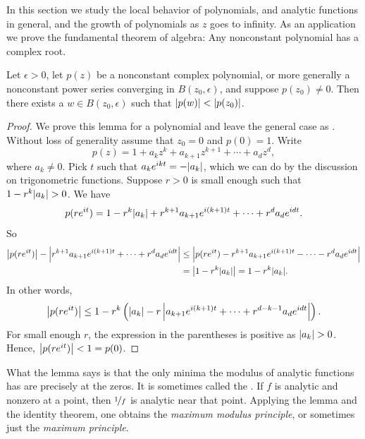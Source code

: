 
In this section we study the local behavior of polynomials,
and analytic functions in general, and the growth of polynomials as $z$ goes to infinity.
As an application we prove the fundamental theorem of algebra: Any nonconstant polynomial
has a complex root.

\begin{lemma} \label{lemma:polyalwaysgetssmaller}
Let $\epsilon > 0$,
let $p(z)$ be a nonconstant complex polynomial, or more generally
a nonconstant power series converging in $B(z_0,\epsilon)$,
and suppose $p(z_0) \not= 0$.
Then there exists a $w \in B(z_0,\epsilon)$ such that $\lvert {p(w)} \rvert < \lvert {p(z_0)} \rvert$.
\end{lemma}

\begin{proof}
We prove this lemma for a polynomial and leave the general case as
.
Without loss of generality assume that $z_0 = 0$ and $p(0) = 1$.  Write
\begin{equation*}
p(z) = 1+a_kz^k + a_{k+1}z^{k+1} + \cdots + a_d z^d ,
\end{equation*}
where $a_k \not= 0$.  Pick $t$ such that $a_k e^{ikt} = -\lvert {a_k} \rvert$, which
we can do by the discussion on trigonometric functions.  Suppose
$r > 0$ is small enough such that
$1-r^k \lvert {a_k} \rvert > 0$.  We have
\begin{equation*}
p(r e^{it}) =
1-r^k \lvert {a_k} \rvert + r^{k+1}a_{k+1}e^{i(k+1)t} + \cdots + r^{d}a_{d}e^{idt} .
\end{equation*}
So
\begin{equation*}
\begin{split}
\left\lvert {
p(r e^{it}) } \right\rvert - \left\lvert {
r^{k+1}a_{k+1}e^{i(k+1)t} + \cdots + r^{d}a_{d}e^{idt}
} \right\rvert
& \leq
\left\lvert {
p(r e^{it}) 
- r^{k+1}a_{k+1}e^{i(k+1)t} - \cdots - r^{d}a_{d}e^{idt}
} \right\rvert
\\
& =
\left\lvert {
1-r^k \lvert {a_k} \rvert
} \right\rvert
=
1-r^k \lvert {a_k} \rvert .
\end{split}
\end{equation*}
In other words,
\begin{equation*}
\left\lvert {
p(r e^{it}) } \right\rvert
\leq
1-r^k \left( \lvert {a_k} \rvert
-
r
\left\lvert {
a_{k+1}e^{i(k+1)t} + \cdots + r^{d-k-1}a_{d}e^{idt}
} \right\rvert
\right) .
\end{equation*}
For small enough $r$, the expression in the parentheses is positive
as $\lvert {a_k} \rvert > 0$.  Hence, $\left\lvert {p(re^{it})} \right\rvert < 1 = p(0)$.
\end{proof}

What the lemma
says is that the only minima the modulus of analytic functions
has are precisely at the zeros.
It is sometimes called the \emph{}.
If $f$ is analytic and nonzero at a point,
then $\nicefrac{1}{f}$ is analytic near that point.  Applying the lemma and
the identity theorem, one obtains the \emph{maximum modulus principle}, or sometimes
just the \emph{maximum principle}.

